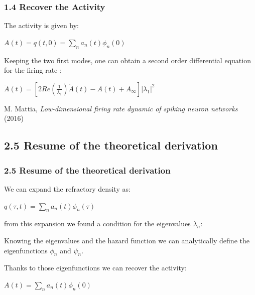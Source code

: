 \documentclass{beamer}
\begin{document}
\begin{frame}
\frametitle{1.4 Recover the Activity}

The activity is given by:

\vspace{0.2cm}
\hspace{3cm} $A(t)=q(t,0)=\sum_n a_n(t)\phi_n(0) $

\vspace{0.5cm}
Keeping the two first modes, one can obtain a second order differential equation for the firing rate :

\vspace{0.2cm}
\hspace{3cm}$\ddot A(t)=[2Re(\frac{1}{\lambda_1})\dot A(t)-A(t)+A_{\infty}] |{\lambda_1}|^2$

\vspace{0.2cm}
\small{M. Mattia, \textit{Low-dimensional firing rate dynamic of spiking neuron networks} (2016)}



\end{frame}


\subsection{2.5 Resume of the theoretical derivation}
\begin{frame}
\frametitle{2.5 Resume of the theoretical derivation}

We can expand the refractory density as:

\vspace{0.2cm}
\hspace{3.1cm}
$q(\tau,t)=\sum_n a_n(t)\phi_n(\tau) $

\pause
\vspace{0.3cm}
from this expansion we found a condition for the eigenvalues $\lambda_n$:
\hspace{2.5cm}

\pause
\vspace{0.3cm}
Knowing the eigenvalues and the hazard function we can analytically define the eigenfunctions $\phi_n$ and $\psi_n$.

\pause
\vspace{0.3cm}
Thanks to those eigenfunctions we can recover the activity: %

\vspace{0.2cm}
\hspace{3.cm}$A(t)=\sum_n a_n(t)\phi_n(0) $%

\end{frame}
\end{document}
